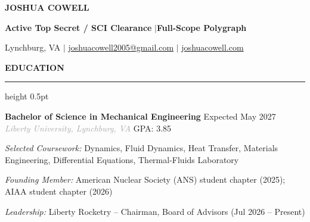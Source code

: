 \documentclass[10pt,letterpaper]{article}
\renewcommand{\section}[1]{
    \vspace{5pt}
    {\normalsize\bfseries\textcolor{navyblue}{\MakeUppercase{#1}}}
    \vspace{0pt}
    
    {\color{navyblue}\hrule height 0.5pt}
    \vspace{3pt}
}
\begin{document}
\begin{center}
    {\fontsize{20}{24}\selectfont\bfseries\textcolor{navyblue}{JOSHUA COWELL}}

    \vspace{3pt}

    {\small\textbf{\textcolor{navyblue}{Active Top Secret / SCI Clearance}} \enspace\textcolor{medgray}{$|$}\enspace \textbf{\textcolor{navyblue}{Full-Scope Polygraph}}}

    \vspace{3pt}

    {\small\color{darkgray}
    Lynchburg, VA \enspace\textcolor{medgray}{$|$}\enspace
    \href{mailto:joshuacowell2005@gmail.com}{joshuacowell2005@gmail.com} \enspace\textcolor{medgray}{$|$}\enspace
    \href{https://joshuacowell.com}{joshuacowell.com}
    }
\end{center}

\vspace{0pt}

\section{Education}

\textbf{Bachelor of Science in Mechanical Engineering} \hfill \textcolor{medgray}{Expected May 2027} \\
\textit{\textcolor{darkgray}{Liberty University, Lynchburg, VA}} \hfill \textcolor{medgray}{GPA: 3.85}

\vspace{1pt}
{\small \textit{Selected Coursework:} Dynamics, Fluid Dynamics, Heat Transfer, Materials Engineering, Differential Equations, Thermal-Fluids Laboratory}

\vspace{1pt}
{\small \textit{Founding Member:} American Nuclear Society (ANS) student chapter (2025); AIAA student chapter (2026)}

\vspace{1pt}
{\small \textit{Leadership:} Liberty Rocketry -- Chairman, Board of Advisors (Jul 2026 -- Present)}

\vspace{1pt}

\end{document}
